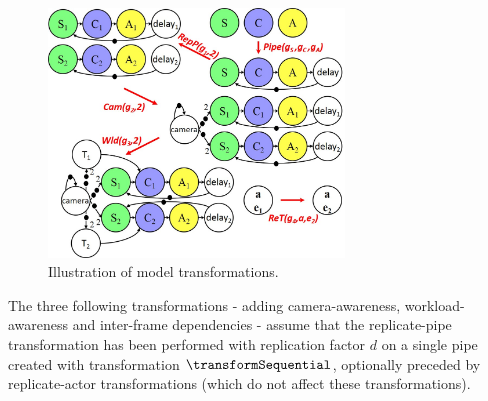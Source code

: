 \begin{figure}[t]
    \centering
    \includegraphics[width=0.7\textwidth]{images/transformations.jpg}
    \caption{Illustration of model transformations.}
    \label{fig:ch7_transformations}
\end{figure}

 The three following transformations - adding camera-awareness, workload-awareness and inter-frame dependencies - assume that the replicate-pipe transformation has been performed with replication factor $d$ on a single pipe created with transformation $\transformSequential$, optionally preceded by replicate-actor transformations (which do not affect these transformations).
 
